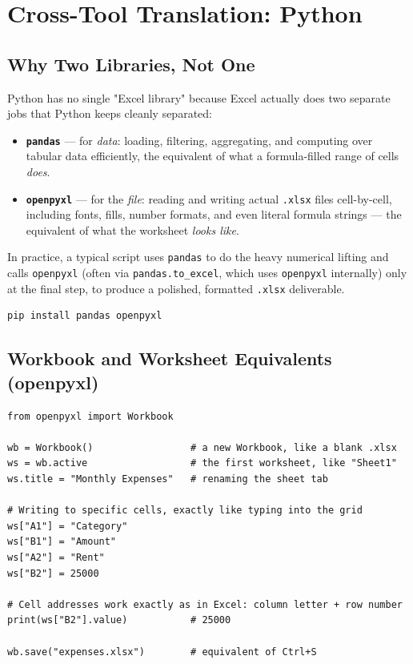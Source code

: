 \documentclass[11pt,a4paper]{article}
\begin{document}
\section{Cross-Tool Translation: Python}
\label{sec:python}

\subsection{Why Two Libraries, Not One}

Python has no single "Excel library" because Excel actually does two separate jobs that Python keeps cleanly separated:

\begin{itemize}
  \item \textbf{\texttt{pandas}} --- for \emph{data}: loading, filtering, aggregating, and computing over tabular data efficiently, the equivalent of what a formula-filled range of cells \emph{does}.
  \item \textbf{\texttt{openpyxl}} --- for the \emph{file}: reading and writing actual \texttt{.xlsx} files cell-by-cell, including fonts, fills, number formats, and even literal formula strings --- the equivalent of what the worksheet \emph{looks like}.
\end{itemize}

In practice, a typical script uses \texttt{pandas} to do the heavy numerical lifting and calls \texttt{openpyxl} (often via \texttt{pandas.to\_excel}, which uses \texttt{openpyxl} internally) only at the final step, to produce a polished, formatted \texttt{.xlsx} deliverable.

\begin{lstlisting}[style=pythonstyle, caption={Environment setup}]
pip install pandas openpyxl
\end{lstlisting}

\subsection{Workbook and Worksheet Equivalents (openpyxl)}

\begin{lstlisting}[style=pythonstyle, caption={Creating a workbook, equivalent to File $\to$ New $\to$ Blank Workbook}]
from openpyxl import Workbook

wb = Workbook()                 # a new Workbook, like a blank .xlsx
ws = wb.active                  # the first worksheet, like "Sheet1"
ws.title = "Monthly Expenses"   # renaming the sheet tab

# Writing to specific cells, exactly like typing into the grid
ws["A1"] = "Category"
ws["B1"] = "Amount"
ws["A2"] = "Rent"
ws["B2"] = 25000

# Cell addresses work exactly as in Excel: column letter + row number
print(ws["B2"].value)           # 25000

wb.save("expenses.xlsx")        # equivalent of Ctrl+S
\end{lstlisting}
\end{document}
